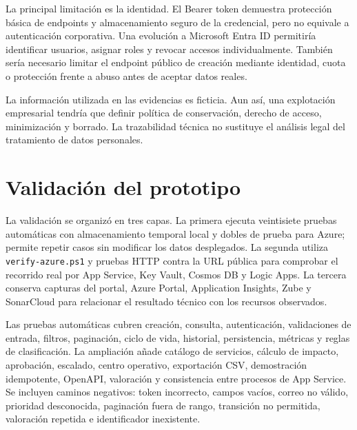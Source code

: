 La principal limitación es la identidad. El Bearer token demuestra protección básica de endpoints y almacenamiento seguro de la credencial, pero no equivale a autenticación corporativa. Una evolución a Microsoft Entra ID permitiría identificar usuarios, asignar roles y revocar accesos individualmente. También sería necesario limitar el endpoint público de creación mediante identidad, cuota o protección frente a abuso antes de aceptar datos reales.

La información utilizada en las evidencias es ficticia. Aun así, una explotación empresarial tendría que definir política de conservación, derecho de acceso, minimización y borrado. La trazabilidad técnica no sustituye el análisis legal del tratamiento de datos personales.

\section{Validación del prototipo}

La validación se organizó en tres capas. La primera ejecuta veintisiete pruebas automáticas con almacenamiento temporal local y dobles de prueba para Azure; permite repetir casos sin modificar los datos desplegados. La segunda utiliza \texttt{verify-azure.ps1} y pruebas HTTP contra la URL pública para comprobar el recorrido real por App Service, Key Vault, Cosmos DB y Logic Apps. La tercera conserva capturas del portal, Azure Portal, Application Insights, Zube y SonarCloud para relacionar el resultado técnico con los recursos observados.

Las pruebas automáticas cubren creación, consulta, autenticación, validaciones de entrada, filtros, paginación, ciclo de vida, historial, persistencia, métricas y reglas de clasificación. La ampliación añade catálogo de servicios, cálculo de impacto, aprobación, escalado, centro operativo, exportación CSV, demostración idempotente, OpenAPI, valoración y consistencia entre procesos de App Service. Se incluyen caminos negativos: token incorrecto, campos vacíos, correo no válido, prioridad desconocida, paginación fuera de rango, transición no permitida, valoración repetida e identificador inexistente.

